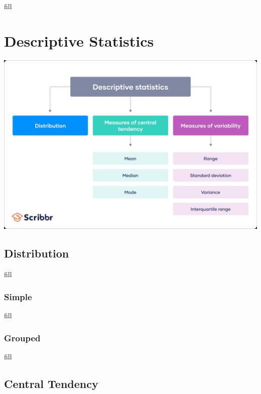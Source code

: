\documentclass[
  b5paper]{book}
\begin{document}
fill

\hypertarget{descriptive-statistics}{%
\section{Descriptive Statistics}\label{descriptive-statistics}}

\href{Descriptive\%20Stats\%20Graphic}{\includegraphics[width=1\textwidth,height=\textheight]{images/desc_stats.jpg}}

\hypertarget{distribution-1}{%
\subsection*{Distribution}\label{distribution-1}}

fill

\hypertarget{simple}{%
\subsubsection*{Simple}\label{simple}}

fill

\hypertarget{grouped}{%
\subsubsection*{Grouped}\label{grouped}}

fill

\hypertarget{central-tendency}{%
\subsection*{Central Tendency}\label{central-tendency}}
\end{document}
